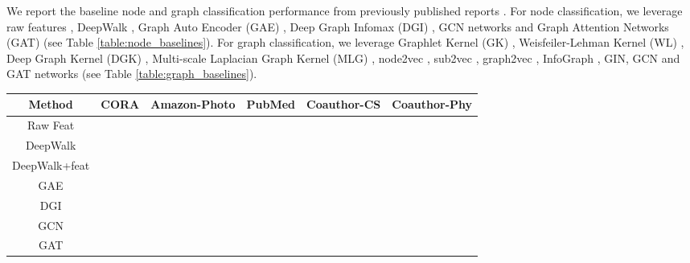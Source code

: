 \documentclass{article}
\theoremstyle{plain}
\theoremstyle{definition}
\theoremstyle{remark}
\begin{document}
We report the baseline node and graph classification performance from previously published reports \citep{hassani2020contrastive, you2020graph, zhu2021graph, xu2021infogcl}. For node classification, we leverage raw features \citep{velickovic2019deep}, DeepWalk \citep{perozzi2014deepwalk}, Graph Auto Encoder (GAE) \citep{kipf2016variational}, Deep Graph Infomax (DGI) \citep{velickovic2019deep}, GCN networks and Graph Attention Networks (GAT) \citep{velivckovic2017graph} (see Table \ref{table:node_baselines}). For graph classification, we leverage Graphlet Kernel (GK) \citep{shervashidze2009efficient}, Weisfeiler-Lehman Kernel (WL) \citep{shervashidze2011weisfeiler}, Deep Graph Kernel (DGK) \citep{yanardag2015deep}, Multi-scale Laplacian Graph Kernel (MLG) \citep{kondor2016multiscale}, node2vec \citep{grover2016node2vec}, sub2vec \citep{adhikari2018sub2vec}, graph2vec \citep{narayanan2017graph2vec}, InfoGraph \citep{sun2019infograph}, GIN, GCN and GAT networks (see Table \ref{table:graph_baselines}).


\begin{table*}[ht!]
\centering
\caption{Baseline node classification accuracies from published reports. }
\label{table:node_baselines}
\vskip 0.15in
\begin{center}
\begin{small}
\begin{sc}
\begin{tabular}{c|c|c|c|c|c}
\toprule
Method & CORA & Amazon-Photo & PubMed & Coauthor-CS & Coauthor-Phy \\
\midrule
Raw Feat &  &  &  &  &   \\
DeepWalk &  &  &  &  &  \\
DeepWalk+feat &  &  &  &  &  \\
GAE &  &  &  &  &  \\
DGI &  &  &  &  &   \\
\midrule
GCN &  &  &  &  &   \\
GAT &  &  &  &  &  \\
\bottomrule
\end{tabular}
\end{sc}
\end{small}
\end{center}
\vskip -0.1in
\end{table*}
\end{document}
